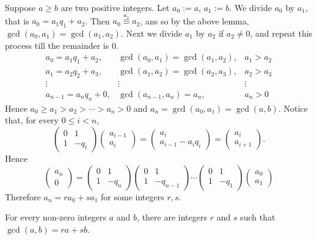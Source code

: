 Suppose $a\geq b$ are two positive integers. Let
$a_0:=a$, $a_1:=b$. We divide $a_0$ by $a_1$, that is
$a_0=a_1q_1+a_2$. Then $a_0\overset{a_1}{\equiv}a_2$,
ans so by the above lemma, $\gcd(a_0,a_1)=\gcd(a_1,a_2)$.
Next we divide $a_1$ by $a_2$ if $a_2\neq 0$,
and repeat this process till the remainder is $0$.
\[\begin{matrix}
    a_0=a_1q_1+a_2, & \gcd(a_0,a_1)=\gcd(a_1,a_2), & a_1>a_2 \\
    a_1=a_2q_2+a_3, & \gcd(a_1,a_2)=\gcd(a_2,a_3), & a_2>a_3 \\
    \vdots          & \vdots                       & \vdots \\
    a_{n-1}=a_nq_n+0,&\gcd(a_{n-1},a_n)=a_n,       & a_n>0
\end{matrix}\]
Hence $a_0\geq a_1>a_2>\cdots>a_n>0$ and $a_n=\gcd(a_0,a_1)=\gcd(a,b)$.
Notice that, for every $0\leq i<n$,
\[\begin{pmatrix}
    0 & 1 \\ 1 & -q_i
\end{pmatrix}\begin{pmatrix}
    a_{i-1} \\ a_i
\end{pmatrix}=\begin{pmatrix}
    a_i \\ a_{i-1}-a_iq_i
\end{pmatrix}=\begin{pmatrix}
    a_i \\ a_{i+1}
\end{pmatrix}.\]
Hence
\[\begin{pmatrix}
    a_n \\ 0
\end{pmatrix}=\begin{pmatrix}
    0 & 1 \\ 1 & -q_n
\end{pmatrix}\begin{pmatrix}
    0 & 1 \\ 1 & -q_{n-1}
\end{pmatrix}\cdots\begin{pmatrix}
    0 & 1 \\ 1 & -q_1
\end{pmatrix}\begin{pmatrix}
    a_0 \\ a_1
\end{pmatrix}\]
Therefore $a_n=ra_0+sa_1$ for some integers $r,s$.

\begin{theorem}
    For every non-zero integers $a$ and $b$, there are integers
    $r$ and $s$ such that $\gcd(a,b)=ra+sb$.
\end{theorem}

